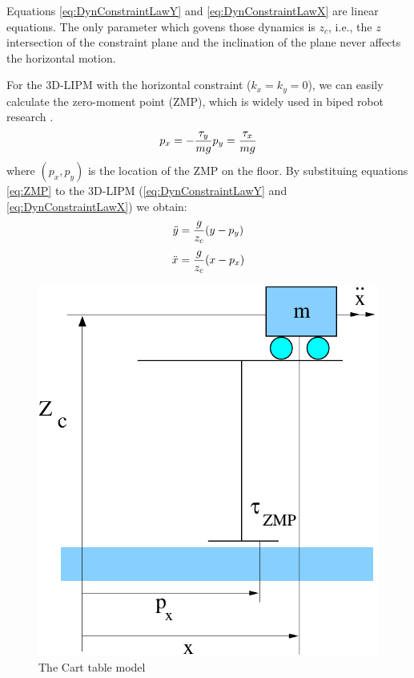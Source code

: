 Equations \ref{eq:DynConstraintLawY} and \ref{eq:DynConstraintLawX} are linear
equations. The only parameter which govens those dynamics is $z_c$, i.e., the
$z$ intersection of the constraint plane and the inclination of the plane never
affects the horizontal motion.
\par
For the 3D-LIPM with the horizontal constraint ($k_x = k_y = 0$), we can easily
calculate the zero-moment point (ZMP), which is widely used in biped robot
research \cite{}.
\begin{equation}
p_x = -\frac{\tau_y}{m g }\\
p_y = \frac{\tau_x}{m g }\\
\label{eq:ZMP}
\end{equation}
where $(p_x,p_y)$ is the location of the ZMP on the floor.
By substituing equations \ref{eq:ZMP} to the 3D-LIPM (\ref{eq:DynConstraintLawY}
and \ref{eq:DynConstraintLawX}) we obtain:
\begin{equation}
\ddot{y} = \frac{g}{z_c}(y-p_y) \\
\label{eq:DynZMPY}
\end{equation}
\begin{equation}
\ddot{x} = \frac{g}{z_c}(x-p_x) \\
\label{eq:DynZMPX}
\end{equation}
\begin{figure}[htb]
\begin{center}
\includegraphics[width=0.5\linewidth]{./figures/PatternGenerator/CartTableModel}
\caption{The Cart table model}
\label{pic:CartTableModel}
\end{center}
\end{figure}

